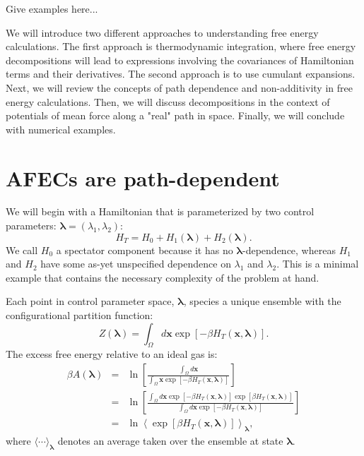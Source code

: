 \documentclass[%
 preprint,
 amsmath,amssymb,
 aps,
]{revtex4-1}
\renewcommand{\vec}[1]{{\bm{#1}}}
\begin{document}
Give examples here...

We will introduce two different approaches to understanding free energy calculations. The first approach is thermodynamic integration, where free energy decompositions will lead to expressions involving the covariances of Hamiltonian terms and their derivatives. The second approach is to use cumulant expansions. Next, we will review the concepts of path dependence and non-additivity in free energy calculations. Then, we will discuss decompositions in the context of potentials of mean force along a "real" path in space. Finally, we will conclude with numerical examples.

\section{AFECs are path-dependent}

We will begin with a Hamiltonian that is parameterized by two control parameters: $\vec\lambda = (\lambda_1, \lambda_2)$:
\begin{equation}
H_T = H_0 + H_1(\vec\lambda) + H_2(\vec\lambda).
\end{equation}
We call $H_0$ a spectator component because it has no $\vec\lambda$-dependence, whereas $H_1$ and $H_2$ have some as-yet unspecified dependence on $\lambda_1$ and $\lambda_2$. This is a minimal example that contains the necessary complexity of the problem at hand.

Each point in control parameter space, $\vec \lambda$, species a unique ensemble with the configurational partition function:
\begin{equation}
Z(\vec\lambda) = 
\int_\Omega d\vec x \exp \left[-\beta H_T\left(\vec x, \vec\lambda\right)\right].
\end{equation}
The excess free energy relative to an ideal gas is:
\begin{eqnarray}
\beta A(\vec\lambda) &=&
\ln \left[
\frac
	{\int_\Omega d\vec x}
	{\int_\Omega \vec x \exp\left[-\beta H_T(\vec x, \vec\lambda) \right]}
\right]\\
&=&
\ln \left[
\frac
	{\int_\Omega d\vec x \exp\left[-\beta H_T(\vec x, \vec\lambda) \right]
	 \exp\left[\beta H_T(\vec x, \vec\lambda) \right]}
	{\int_\Omega d\vec x \exp\left[-\beta H_T(\vec x, \vec\lambda) \right]}
\right]\\
&=&
\ln\left<\exp\left[\beta H_T(\vec x, \vec\lambda)\right]\right>_{\vec\lambda},
\end{eqnarray}
where $\langle \cdots \rangle_{\vec\lambda}$ denotes an average taken over the ensemble at state $\vec\lambda$.
\end{document}
